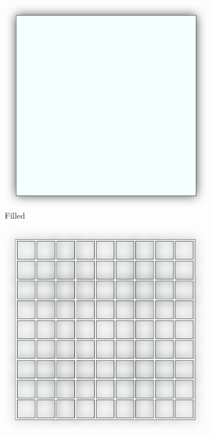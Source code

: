 \documentclass[12pt, letterpaper]{article}
\begin{document}
\begin{figure}[H]
	\label{parts}
	\caption{Test Parts}
	\begin{subfigure}[b]{.3\linewidth}
		\includegraphics[width=\linewidth]{filled}
		\caption{Filled}
	\end{subfigure}
	\begin{subfigure}[b]{.3\linewidth}
		\includegraphics[width=\linewidth]{square}

\end{subfigure}
\end{figure}
\end{document}
